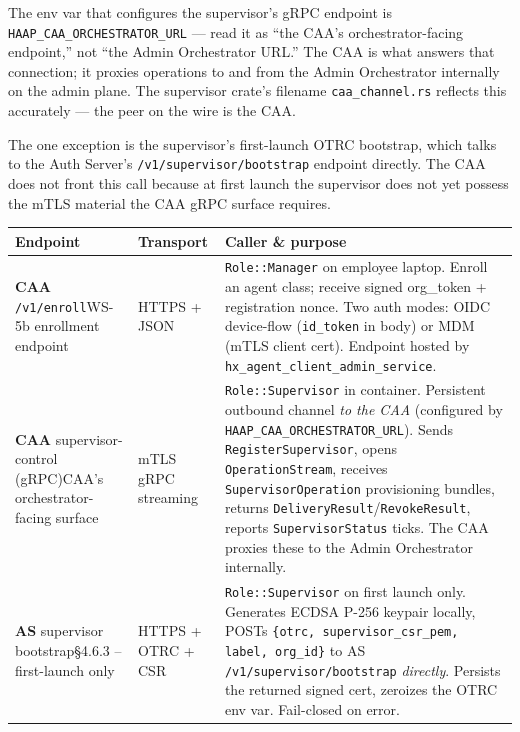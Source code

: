 \documentclass[11pt, a4paper]{article}
\newcommand{\code}[1]{\texttt{\small #1}}
\newcommand{\filepath}[1]{\textcolor{accentpurple}{\texttt{\small #1}}}
\begin{document}
\begin{infobox}
The env var that configures the supervisor's gRPC endpoint is
\code{HAAP\_CAA\_ORCHESTRATOR\_URL} --- read it as ``the CAA's
orchestrator-facing endpoint,'' not ``the Admin Orchestrator URL.'' The
CAA is what answers that connection; it proxies operations to and from
the Admin Orchestrator internally on the admin plane. The supervisor
crate's filename \code{caa\_channel.rs} reflects this accurately --- the
peer on the wire is the CAA.
\end{infobox}

The one exception is the supervisor's first-launch OTRC bootstrap, which
talks to the Auth Server's \code{/v1/supervisor/bootstrap} endpoint
directly. The CAA does not front this call because at first launch the
supervisor does not yet possess the mTLS material the CAA gRPC surface
requires.

\begin{center}
\renewcommand{\arraystretch}{1.35}
\begin{tabularx}{\textwidth}{L{4.8cm} L{2.4cm} X}
\toprule
\textbf{Endpoint} & \textbf{Transport} & \textbf{Caller \& purpose}\\
\midrule
\textbf{CAA} \code{/v1/enroll}\newline\textcolor{hawcxmuted}{\scriptsize\sffamily WS-5b enrollment endpoint} &
  HTTPS + JSON &
  \code{Role::Manager} on employee laptop. Enroll an agent class; receive signed org\_token + registration nonce. Two auth modes: OIDC device-flow (\code{id\_token} in body) or MDM (mTLS client cert). Endpoint hosted by \filepath{hx\_agent\_client\_admin\_service}.\\
\addlinespace[2pt]
\textbf{CAA} supervisor-control (gRPC)\newline\textcolor{hawcxmuted}{\scriptsize\sffamily CAA's orchestrator-facing surface} &
  mTLS gRPC streaming &
  \code{Role::Supervisor} in container. Persistent outbound channel \emph{to the CAA} (configured by \code{HAAP\_CAA\_ORCHESTRATOR\_URL}). Sends \code{RegisterSupervisor}, opens \code{OperationStream}, receives \code{SupervisorOperation} provisioning bundles, returns \code{DeliveryResult}/\code{RevokeResult}, reports \code{SupervisorStatus} ticks. The CAA proxies these to the Admin Orchestrator internally.\\
\addlinespace[2pt]
\textbf{AS} supervisor bootstrap\newline\textcolor{hawcxmuted}{\scriptsize\sffamily \S4.6.3 -- first-launch only} &
  HTTPS + OTRC + CSR &
  \code{Role::Supervisor} on first launch only. Generates ECDSA P-256 keypair locally, POSTs \code{\{otrc, supervisor\_csr\_pem, label, org\_id\}} to AS \code{/v1/supervisor/bootstrap} \emph{directly}. Persists the returned signed cert, zeroizes the OTRC env var. Fail-closed on error.\\
\bottomrule
\end{tabularx}
\end{center}
\end{document}
